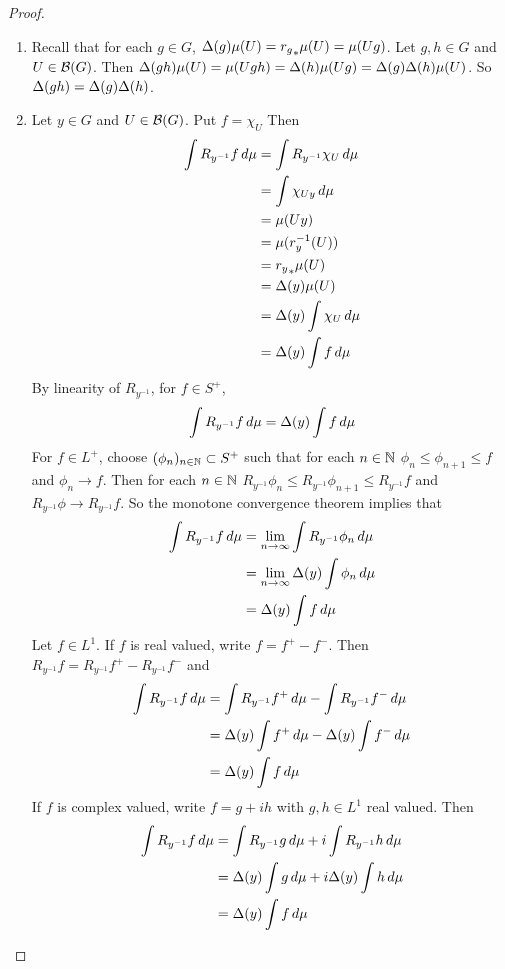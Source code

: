 \documentclass{book}
\begin{document}
	\begin{proof}\
		\begin{enumerate}
			\item Recall that for each $g \in G$, $\Delta(g)\mu(U) = {r_g}_*\mu(U) = \mu(Ug)$. Let $g, h \in G$ and $U \in \mathcal{B}(G)$. Then $\Delta(gh)\mu(U) = \mu(Ugh) = \Delta(h)\mu(Ug) = \Delta(g) \Delta(h)\mu(U)$. So $\Delta(gh) = \Delta(g) \Delta(h)$.
			\item Let $y \in G$ and $U \in \mathcal{B}(G)$. Put $f = \chi_U$ Then 
			\begin{align*}
				\int R_{y^{-1}} f \, d \mu 
				& = \int R_{y^{-1}} \chi_U \, d \mu \\
				& = \int \chi_{Uy} \, d \mu \\
				& = \mu(Uy) \\
				&= \mu(r_y^{-1}(U)) \\
				&= {r_y}_* \mu(U) \\
				& = \Delta(y) \mu(U) \\
				& = \Delta(y)  \int \chi_U \, d \mu \\
				&= \Delta(y)  \int f \, d \mu
			\end{align*}
			By linearity of $R_{y^{-1}}$, for $f \in S^+$, $$\int R_{y^{-1}} f \, d \mu = \Delta(y) \int f \, d \mu$$
			For $f \in L^+$, choose $(\phi_{n})_{n \in \mathbb{N}} \subset S^+$ such that for each $n \in \mathbb{N}$ $\phi_n \leq \phi_{n+1} \leq f$ and $\phi_n \rightarrow f$. Then for each $n \in \mathbb{N}$ $R_{y^{-1}} \phi_n \leq R_{y^{-1}} \phi_{n+1} \leq R_{y^{-1}} f$ and $R_{y^{-1}} \phi \rightarrow R_{y^{-1}} f$. So the monotone convergence theorem implies that 
			\begin{align*}
				\int R_{y^{-1}} f \, d \mu 
				& = \lim \limits_{n \rightarrow \infty} \int R_{y^{-1}} \phi_n \, d \mu \\
				& = \lim \limits_{n \rightarrow \infty} \Delta(y) \int \phi_n \, d \mu \\
				& = \Delta(y) \int f \, d \mu \\
			\end{align*}
			Let $f \in L^1$. If $f$ is real valued, write $f = f^+ - f^-$. Then $R_{y^{-1}} f = R_{y^{-1}} f^+ - R_{y^{-1}} f^-$ and 
			\begin{align*}
				\int R_{y^{-1}} f \, d \mu 
				& = \int R_{y^{-1}} f^+ \, d \mu - \int R_{y^{-1}} f^- \, d \mu \\
				& = \Delta(y) \int f^+ \, d \mu - \Delta(y) \int f^- \, d \mu \\
				& = \Delta(y) \int f \, d \mu
			\end{align*}
			If $f$ is complex valued, write $f = g + ih$ with $g, h \in L^1$ real valued. Then 
			\begin{align*}
				\int R_{y^{-1}} f \, d \mu 
				& = \int R_{y^{-1}} g \, d \mu + i \int R_{y^{-1}} h \, d \mu \\
				& = \Delta(y) \int g \, d \mu +i \Delta(y) \int h \, d \mu \\
				& = \Delta(y) \int f \, d \mu
			\end{align*}
		\end{enumerate}
	\end{proof}
\end{document}
